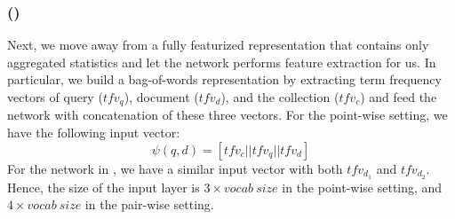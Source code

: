 \subsubsection{\Feedtwo (\ftwo)} 
Next, we move away from a fully featurized representation that contains only aggregated statistics and let the network performs feature extraction for us. In particular, we build a bag-of-words representation by extracting term frequency vectors of query ($tfv_q$), document ($tfv_d$), and the collection ($tfv_c$) and feed the network with concatenation of these three vectors. For the point-wise setting, we have the following input vector:
\begin{equation}
\psi(q, d) = [tfv_c || tfv_q || tfv_d]
\end{equation}
For the network in \modelthree, we have a similar input vector with both $tfv_{d_1}$ and $tfv_{d_2}$. Hence, the size of the input layer is $3 \times vocab~size$ in the point-wise setting, and $4 \times vocab~size$ in the pair-wise setting. 

